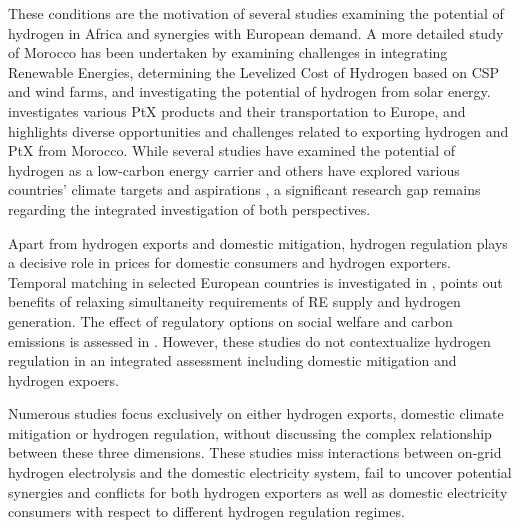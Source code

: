 These conditions are the motivation of several studies \cite{vanWijk2021, AbouSeada2022, vanderZwaan2021, Schellekens2010, Cavana2021, Touili2022, Timmerberg2019a, Sens2022} examining the potential of hydrogen in Africa and synergies with European demand. A more detailed study of Morocco has been undertaken by \cite{Boulakhbar2020} examining challenges in integrating Renewable Energies, \cite{Khouya2020} determining the Levelized Cost of Hydrogen based on CSP and wind farms, and \cite{Touili2018} investigating the potential of hydrogen from solar energy. \cite{Hampp2021} investigates various PtX products and their transportation to Europe, and \cite{Eichhammer2019} highlights diverse opportunities and challenges related to exporting hydrogen and PtX from Morocco. While several studies\cite{Hampp2021, AbouSeada2022, vanWijk2021} have examined the potential of hydrogen as a low-carbon energy carrier and others have explored various countries' climate targets and aspirations \cite{Boulakhbar2020}, a significant research gap remains regarding the integrated investigation of both perspectives. 


Apart from hydrogen exports and domestic mitigation, hydrogen regulation plays a decisive role in prices for domestic consumers and hydrogen exporters. Temporal matching in selected European countries is investigated in \cite{Zeyen2022}, \cite{Ruhnau2023a} points out benefits of relaxing simultaneity requirements of RE supply and hydrogen generation. 
The effect of regulatory options on social welfare and carbon emissions is assessed in \cite{Brauer2022}. However, these studies do not contextualize hydrogen regulation in an integrated assessment including domestic mitigation and hydrogen expoers.


Numerous studies focus exclusively on either hydrogen exports, domestic climate mitigation or hydrogen regulation, without discussing the complex relationship between these three dimensions. These studies miss interactions between on-grid hydrogen electrolysis and the domestic electricity system, fail to uncover potential synergies and conflicts for both hydrogen exporters as well as domestic electricity consumers with respect to different hydrogen regulation regimes.





